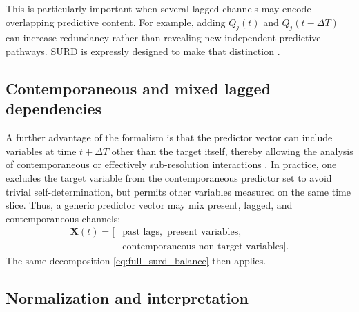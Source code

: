 \documentclass[fleqn,usenatbib]{mnras}
\begin{document}
This is particularly important when several lagged channels may encode overlapping predictive content. For example, adding \(Q_j(t)\) and \(Q_j(t-\Delta T)\) can increase redundancy rather than revealing new independent predictive pathways. SURD is expressly designed to make that distinction \cite{MartinezSanchez2024SURD}.

\subsection{Contemporaneous and mixed lagged dependencies}

A further advantage of the formalism is that the predictor vector can include variables at time \(t+\Delta T\) other than the target itself, thereby allowing the analysis of contemporaneous or effectively sub-resolution interactions \cite{MartinezSanchez2024SURD}. In practice, one excludes the target variable from the contemporaneous predictor set to avoid trivial self-determination, but permits other variables measured on the same time slice. Thus, a generic predictor vector may mix present, lagged, and contemporaneous channels:
\begin{equation}
\begin{split}
\mathbf{X}(t) = \bigl[ & \text{past lags}, \text{ present variables}, \\
                       & \text{contemporaneous non-target variables} \bigr].
\end{split}
\end{equation}
The same decomposition \eqref{eq:full_surd_balance} then applies.

\subsection{Normalization and interpretation}
\end{document}
